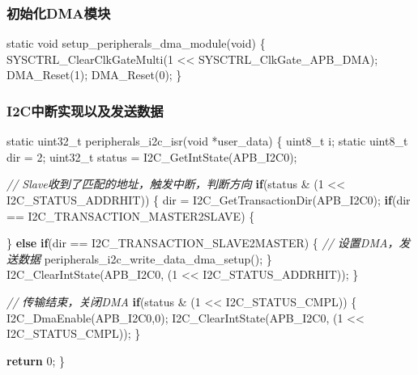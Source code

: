 \documentclass[
  12pt,
]{book}
\newenvironment{Shaded}{\begin{snugshade}}{\end{snugshade}}
\newcommand{\CommentTok}[1]{\textcolor[rgb]{0.56,0.35,0.01}{\textit{#1}}}
\newcommand{\ControlFlowTok}[1]{\textcolor[rgb]{0.13,0.29,0.53}{\textbf{#1}}}
\newcommand{\DataTypeTok}[1]{\textcolor[rgb]{0.13,0.29,0.53}{#1}}
\newcommand{\DecValTok}[1]{\textcolor[rgb]{0.00,0.00,0.81}{#1}}
\newcommand{\NormalTok}[1]{#1}
\begin{document}
\hypertarget{ux521dux59cbux5316dmaux6a21ux5757-1}{%
\subsubsection{初始化DMA模块}\label{ux521dux59cbux5316dmaux6a21ux5757-1}}

\begin{Shaded}
\begin{Highlighting}[]
\DataTypeTok{static} \DataTypeTok{void}\NormalTok{ setup_peripherals_dma_module(}\DataTypeTok{void}\NormalTok{)}
\NormalTok{\{}
\NormalTok{    SYSCTRL_ClearClkGateMulti(}\DecValTok{1}\NormalTok{ << SYSCTRL_ClkGate_APB_DMA);}
\NormalTok{    DMA_Reset(}\DecValTok{1}\NormalTok{);}
\NormalTok{    DMA_Reset(}\DecValTok{0}\NormalTok{);}
\NormalTok{\}}
\end{Highlighting}
\end{Shaded}

\hypertarget{i2cux4e2dux65adux5b9eux73b0ux4ee5ux53caux53d1ux9001ux6570ux636e-2}{%
\subsubsection{I2C中断实现以及发送数据}\label{i2cux4e2dux65adux5b9eux73b0ux4ee5ux53caux53d1ux9001ux6570ux636e-2}}

\begin{Shaded}
\begin{Highlighting}[]
\DataTypeTok{static} \DataTypeTok{uint32_t}\NormalTok{ peripherals_i2c_isr(}\DataTypeTok{void}\NormalTok{ *user_data)}
\NormalTok{\{}
  \DataTypeTok{uint8_t}\NormalTok{ i;}
  \DataTypeTok{static} \DataTypeTok{uint8_t}\NormalTok{ dir = }\DecValTok{2}\NormalTok{;}
  \DataTypeTok{uint32_t}\NormalTok{ status = I2C_GetIntState(APB_I2C0);}

  \CommentTok{// Slave收到了匹配的地址，触发中断，判断方向}
  \ControlFlowTok{if}\NormalTok{(status & (}\DecValTok{1}\NormalTok{ << I2C_STATUS_ADDRHIT))}
\NormalTok{  \{}
\NormalTok{    dir = I2C_GetTransactionDir(APB_I2C0);}
    \ControlFlowTok{if}\NormalTok{(dir == I2C_TRANSACTION_MASTER2SLAVE)}
\NormalTok{    \{}

\NormalTok{    \}}
    \ControlFlowTok{else} \ControlFlowTok{if}\NormalTok{(dir == I2C_TRANSACTION_SLAVE2MASTER)}
\NormalTok{    \{}
      \CommentTok{// 设置DMA，发送数据  }
\NormalTok{      peripherals_i2c_write_data_dma_setup();}
\NormalTok{    \}}
\NormalTok{    I2C_ClearIntState(APB_I2C0, (}\DecValTok{1}\NormalTok{ << I2C_STATUS_ADDRHIT));}
\NormalTok{  \}}
  
  \CommentTok{// 传输结束，关闭DMA}
  \ControlFlowTok{if}\NormalTok{(status & (}\DecValTok{1}\NormalTok{ << I2C_STATUS_CMPL))}
\NormalTok{  \{}
\NormalTok{    I2C_DmaEnable(APB_I2C0,}\DecValTok{0}\NormalTok{);}
\NormalTok{    I2C_ClearIntState(APB_I2C0, (}\DecValTok{1}\NormalTok{ << I2C_STATUS_CMPL));}
\NormalTok{  \}}

  \ControlFlowTok{return} \DecValTok{0}\NormalTok{;}
\NormalTok{\}}
\end{Highlighting}
\end{Shaded}
\end{document}
